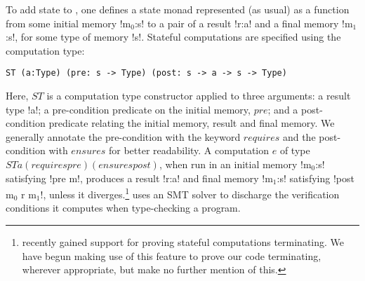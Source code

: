 To add state to \fstar, one defines a state monad represented (as
usual) as a function from some initial memory \lst!m$_0$:s! to a
pair of a result \lst!r:a! and a final memory \lst!m$_1$:s!, for
some type of memory \lst!s!. Stateful computations are specified
using the computation type:
%
\begin{lstlisting}[numbers=none]
  ST (a:Type) (pre: s -> Type) (post: s -> a -> s -> Type)
\end{lstlisting}
%
Here, \lst$ST$ is a computation type constructor applied to three
arguments: a result type \lst!a!; a pre-condition predicate on the
initial memory, \lst$pre$; and a post-condition predicate relating the
initial memory, result and final memory. We generally annotate the
pre-condition with the keyword \lst$requires$ and the post-condition
with \lst$ensures$ for better readability.  A computation \lst$e$ of
type
%
\lst$ST a (requires pre) (ensures post)$, when run in an initial
memory \lst!m$_0$:s! satisfying \lst!pre m!, produces a result
\lst!r:a! and final memory \lst!m$_1$:s! satisfying
%
\lst!post m$_0$ r m$_1$!, unless it diverges.\footnote{\fstar recently
  gained support for proving stateful computations terminating. We
  have begun making use of this feature to prove our code terminating,
  wherever appropriate, but make no further mention of this.} \fstar
uses an SMT solver to discharge the verification conditions it
computes when type-checking a program.




